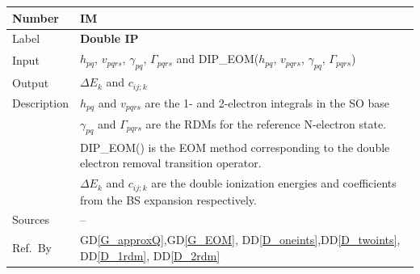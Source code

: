 \documentclass[12pt]{article}
\newcommand{\colAwidth}{0.13\textwidth}
\newcommand{\colBwidth}{0.82\textwidth}
\newcommand{\dref}[1]{GD\ref{#1}}
\newcommand{\ddref}[1]{DD\ref{#1}}
\newcounter{instnum} %
\begin{document}
\noindent
\begin{minipage}{\textwidth}
	\renewcommand*{\arraystretch}{1.5}
	\begin{tabular}{| p{\colAwidth} | p{\colBwidth}|}
		\hline
		\rowcolor[gray]{0.9}
		Number& IM{instnum}\theinstnum \label{IM_DIP}\\
		\hline
		Label& \bf Double IP\\
		\hline
		Input&$h_{pq}$, $v_{pqrs}$, $\gamma_{pq}$, $\Gamma_{pqrs}$ and 
		DIP\_EOM($h_{pq}$, $v_{pqrs}$, $\gamma_{pq}$, $\Gamma_{pqrs}$)\\
		\hline
		Output&$\Delta E_k$ and $c_{ij;k}$\\
		\hline
		Description& $h_{pq} $ and $ v_{pqrs}$ are the 1- and 2-electron 
		integrals in the SO base\\
		& $\gamma_{pq}$ and $\Gamma_{pqrs}$ are the RDMs for the reference 
		N-electron state.\\
		& DIP\_EOM() is the EOM method corresponding to the double electron 
		removal transition operator.\\
		&$\Delta E_k$ and $c_{ij;k}$ are the double ionization energies and 
		coefficients from the BS expansion respectively.\\
		\hline
		Sources& -- \\
		\hline
		Ref.\ By & \dref{G_approxQ},\dref{G_EOM},  
		\ddref{D_oneints},\ddref{D_twoints}, \ddref{D_1rdm}, 
		\ddref{D_2rdm}\\
		\hline
	\end{tabular}
\end{minipage}\\

~\newline
\end{document}
